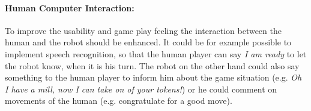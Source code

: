 \documentclass[a4paper]{spie}  %
\begin{document}
\begin{large}
\paragraph{Human Computer Interaction:} To improve the usability and game play feeling the interaction between the human and the robot should be enhanced. It could be for example possible to implement speech recognition, so that the human player can say \emph{I am ready} to let the robot know, when it is his turn. The robot on the other hand could also say something to the human player to inform him about the game situation (e.g. \emph{Oh I have a mill, now I can take on of your tokens!}) or he could comment on movements of the human (e.g. congratulate for a good move).
\newpage



\end{large}
\end{document}
